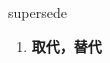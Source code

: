 
\begin{frame}
{\huge supersede}
\begin{center}
\begin{enumerate}\Large
  \item \textbf{取代，替代}
\end{enumerate}
\end{center}
\end{frame}
